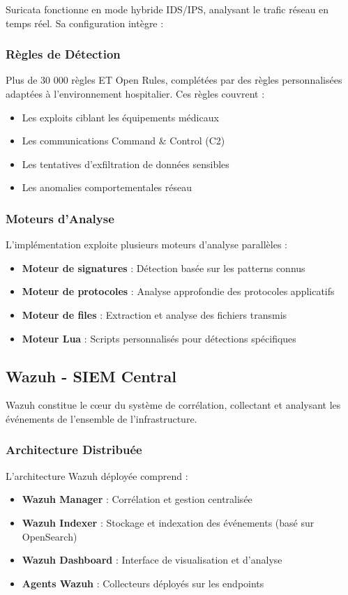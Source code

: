 Suricata fonctionne en mode hybride IDS/IPS, analysant le trafic réseau en temps réel. Sa configuration intègre :

\subsubsection{Règles de Détection}
Plus de 30 000 règles ET Open Rules, complétées par des règles personnalisées adaptées à l'environnement hospitalier. Ces règles couvrent :
\begin{itemize}
    \item Les exploits ciblant les équipements médicaux
    \item Les communications Command \& Control (C2)
    \item Les tentatives d'exfiltration de données sensibles
    \item Les anomalies comportementales réseau
\end{itemize}

\subsubsection{Moteurs d'Analyse}
L'implémentation exploite plusieurs moteurs d'analyse parallèles :
\begin{itemize}
    \item \textbf{Moteur de signatures} : Détection basée sur les patterns connus
    \item \textbf{Moteur de protocoles} : Analyse approfondie des protocoles applicatifs
    \item \textbf{Moteur de files} : Extraction et analyse des fichiers transmis
    \item \textbf{Moteur Lua} : Scripts personnalisés pour détections spécifiques
\end{itemize}

\subsection{Wazuh - SIEM Central}

Wazuh constitue le cœur du système de corrélation, collectant et analysant les événements de l'ensemble de l'infrastructure.

\subsubsection{Architecture Distribuée}
L'architecture Wazuh déployée comprend :
\begin{itemize}
    \item \textbf{Wazuh Manager} : Corrélation et gestion centralisée
    \item \textbf{Wazuh Indexer} : Stockage et indexation des événements (basé sur OpenSearch)
    \item \textbf{Wazuh Dashboard} : Interface de visualisation et d'analyse
    \item \textbf{Agents Wazuh} : Collecteurs déployés sur les endpoints
\end{itemize}

